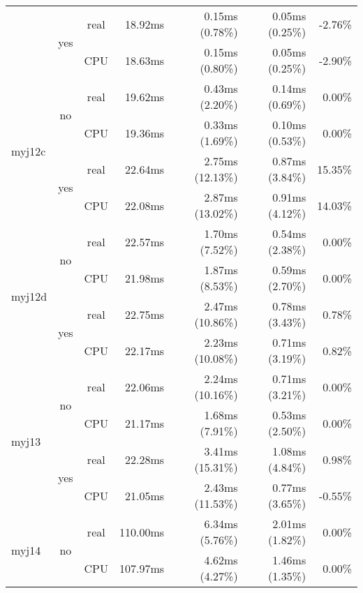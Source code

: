 \documentclass[en]{pracamgr}
\begin{document}
\begin{appendices}
\begin{small}
\begin{longtable}{|l|c|c|r|r|r|r|}
                          \cline{2-7}
                          & \multirow{2}{*}{yes} & real & 18.92ms & 0.15ms (0.78\%) & 0.05ms (0.25\%) & -2.76\% \\*
                          &                      & CPU  & 18.63ms & 0.15ms (0.80\%) & 0.05ms (0.25\%) & -2.90\% \\
\hline
\multirow{4}{*}{myj12c}   & \multirow{2}{*}{no}  & real & 19.62ms & 0.43ms (2.20\%) & 0.14ms (0.69\%) & 0.00\% \\*
                          &                      & CPU  & 19.36ms & 0.33ms (1.69\%) & 0.10ms (0.53\%) & 0.00\% \\*
                          \cline{2-7}
                          & \multirow{2}{*}{yes} & real & 22.64ms & 2.75ms (12.13\%) & 0.87ms (3.84\%) & 15.35\% \\*
                          &                      & CPU  & 22.08ms & 2.87ms (13.02\%) & 0.91ms (4.12\%) & 14.03\% \\
\hline
\multirow{4}{*}{myj12d}   & \multirow{2}{*}{no}  & real & 22.57ms & 1.70ms (7.52\%) & 0.54ms (2.38\%) & 0.00\% \\*
                          &                      & CPU  & 21.98ms & 1.87ms (8.53\%) & 0.59ms (2.70\%) & 0.00\% \\*
                          \cline{2-7}
                          & \multirow{2}{*}{yes} & real & 22.75ms & 2.47ms (10.86\%) & 0.78ms (3.43\%) & 0.78\% \\*
                          &                      & CPU  & 22.17ms & 2.23ms (10.08\%) & 0.71ms (3.19\%) & 0.82\% \\
\hline
\multirow{4}{*}{myj13}    & \multirow{2}{*}{no}  & real & 22.06ms & 2.24ms (10.16\%) & 0.71ms (3.21\%) & 0.00\% \\*
                          &                      & CPU  & 21.17ms & 1.68ms (7.91\%) & 0.53ms (2.50\%) & 0.00\% \\*
                          \cline{2-7}
                          & \multirow{2}{*}{yes} & real & 22.28ms & 3.41ms (15.31\%) & 1.08ms (4.84\%) & 0.98\% \\*
                          &                      & CPU  & 21.05ms & 2.43ms (11.53\%) & 0.77ms (3.65\%) & -0.55\% \\
\hline
\multirow{4}{*}{myj14}    & \multirow{2}{*}{no}  & real & 110.00ms & 6.34ms (5.76\%) & 2.01ms (1.82\%) & 0.00\% \\*
                          &                      & CPU  & 107.97ms & 4.62ms (4.27\%) & 1.46ms (1.35\%) & 0.00\% \\*

\end{longtable}
\end{small}
\end{appendices}
\end{document}
